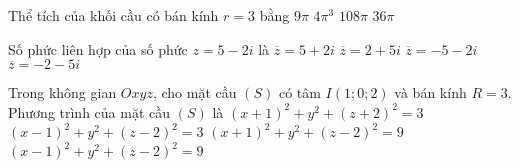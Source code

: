 \begin{ex}%
	Thể tích của khối cầu có bán kính $r=3$ bằng
	\choice
	{$9\pi$}
	{$4\pi^3$}
	{$108\pi$}
	{\True $36\pi$}
\end{ex}

\begin{ex}%
	Số phức liên hợp của số phức $z=5-2i$ là
	\choice
	{\True $\overline{z}=5+2i$}
	{$\overline{z}=2+5i$}
	{$\overline{z}=-5-2i$}
	{$\overline{z}=-2-5i$}
\end{ex}

\begin{ex}%
	Trong không gian $Oxyz$, cho mặt cầu $(S)$ có tâm $I(1;0;2)$ và bán kính $R=3$. Phương trình của mặt cầu $(S)$ là 
	\choice
	{$(x+1)^2+y^2+(z+2)^2=3$}
	{$(x-1)^2+y^2+(z-2)^2=3$}
	{$(x+1)^2+y^2+(z-2)^2=9$}
	{\True $(x-1)^2+y^2+(z-2)^2=9$}
\end{ex}

